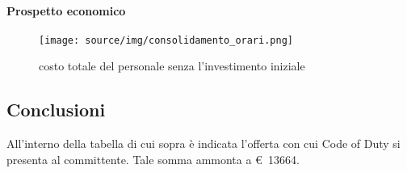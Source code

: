         \paragraph{Prospetto economico}
        
        \def\salarycontent{
            {Amministratore,54,20,1080},
            {Analista,41,25,1025},
            {Progettista,192,22,4224},
            {Programmatore,211,15,3165},
            {Responsabile,41,30,1230},
            {Verificatore,196,15,2940},
            {Totale,735,127,13664},
        }
        
        \begin{figure}[H]
            \centering
            \texttt{[image: source/img/consolidamento\_orari.png]}
            \caption{costo totale del personale senza l'investimento iniziale}
        \end{figure}
    \subsection{Conclusioni}
    All'interno della tabella di cui sopra è indicata l'offerta con cui Code of Duty si presenta al committente. Tale somma ammonta a \euro\ 13664.
